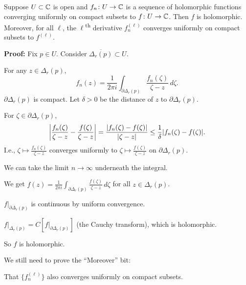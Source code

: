 \documentclass[10pt,aspectratio=169]{beamer}
\begin{document}
\begin{frame}

\begin{theorem}
Suppose $U \subset {\mathbb{C}}$ is open and $f_n \colon U \to {\mathbb{C}}$ is a sequence
of holomorphic functions converging uniformly on compact subsets to
$f \colon U \to {\mathbb{C}}$.
\pause
Then $f$ is holomorphic.
\pause
Moreover, for all $\ell$, the $\ell$\textsuperscript{th} derivative
$f_n^{(\ell)}$ converges uniformly on compact subsets to $f^{(\ell)}$.
\end{theorem}

\pause

\textbf{Proof:}
Fix $p \in U$.
\pause
Consider $\overline{\Delta_r(p)} \subset U$.

\medskip
\pause

For any $z \in \Delta_r(p)$,
\[
f_n(z) = \frac{1}{2\pi i}
\int_{\partial \Delta_r(p)} \frac{f_n(\zeta)}{\zeta-z} \, d\zeta .
\]
\pause
$\partial \Delta_r(p)$ is compact.
Let $\delta > 0$ be the distance of $z$ to
$\partial \Delta_r(p)$.

\medskip
\pause

For $\zeta \in \partial \Delta_r(p)$,
\begin{equation*}
\left\lvert {\frac{f_n(\zeta)}{\zeta-z}
-
\frac{f(\zeta)}{\zeta-z}
} \right\rvert
=
\frac{\lvert {f_n(\zeta)-f(\zeta)} \rvert}{\lvert {\zeta-z} \rvert}
\leq
\frac{1}{\delta}
\lvert {f_n(\zeta)-f(\zeta)} \rvert .
\end{equation*}
\pause
I.e.,
$\zeta \mapsto \frac{f_n(\zeta)}{\zeta-z}$ converges uniformly to 
$\zeta \mapsto \frac{f(\zeta)}{\zeta-z}$ on $\partial \Delta_r(p)$.

\medskip
\pause

We can take the limit $n \to \infty$ underneath the integral.
\end{frame}

\begin{frame}
We get
\qquad
$
\displaystyle
f(z) = \frac{1}{2\pi i}
\int_{\partial \Delta_r(p)} \frac{f(\zeta)}{\zeta-z} \, d\zeta
$
\qquad
for all $z \in \Delta_r(p)$.

\medskip
\pause

$f|_{\partial \Delta_r(p)}$ is continuous by uniform convergence.

\medskip
\pause

$f|_{\Delta_r(p)} = C[f|_{\partial \Delta_r(p)}]$ (the Cauchy transform),
which is holomorphic.

\medskip
\pause

So $f$ is holomorphic.

\medskip
\pause

We still need to prove the ``Moreover'' bit:

That $\bigl\{ f_n^{(\ell)} \bigr\}$
also
converges uniformly on compact subsets.
\end{frame}
\end{document}
